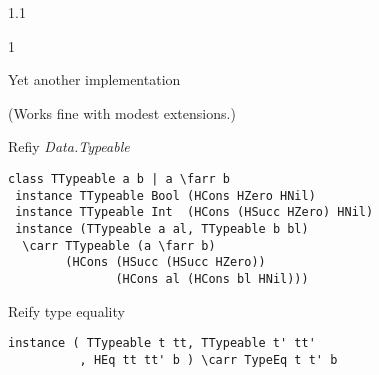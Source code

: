 \documentclass{slides}
\newenvironment{myslide}{\begin{slide}\color{Blue}\begin{boxedminipage}{1.1\hsize}\begin{boxedminipage}{1\hsize}\color{Black}
\vspace{-170\in}
}{%
\smallskip
\end{boxedminipage}
\end{boxedminipage}
\end{slide}}
\newenvironment{myslide}{\begin{slide}
}{%
\end{slide}}
\newenvironment{myslide}{\begin{slide}\color{White}\begin{boxedminipage}{1.1\hsize}\color{Black}
\vspace{-170\in}
}{%
\smallskip
\end{boxedminipage}
\end{slide}}
\newcommand{\header}[1]{{\large \color{Red} #1}}
\newcommand{\blau}[1]{{\vspace{-50\in}\normalsize \color{Blue} #1}}
\newcommand{\farr}{\ensuremath{\to}}
\newcommand{\carr}{\ensuremath{\Rightarrow}}
\begin{document}
\begin{myslide}

\header{Yet another implementation}

\vspace{-77\in}

{\tiny (Works fine with modest extensions.)}

\vspace{-42\in}

\blau{Refiy \emph{Data.Typeable}}

\medskip

\begin{Verbatim}[fontfamily=courier,fontsize=\small,commandchars=\\\{\}]
 class TTypeable a b | a \farr b
 instance TTypeable Bool (HCons HZero HNil)
 instance TTypeable Int  (HCons (HSucc HZero) HNil)
 instance (TTypeable a al, TTypeable b bl)
  \carr TTypeable (a \farr b)
        (HCons (HSucc (HSucc HZero))
               (HCons al (HCons bl HNil)))
\end{Verbatim}

\vspace{-77\in}

\blau{Reify type equality}

\medskip

\begin{Verbatim}[fontfamily=courier,fontsize=\small,commandchars=\\\{\}]
 instance ( TTypeable t tt, TTypeable t' tt'
          , HEq tt tt' b ) \carr TypeEq t t' b
\end{Verbatim}

\end{myslide}



\end{document}
